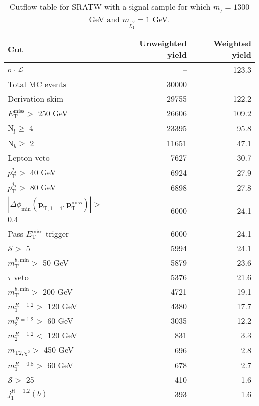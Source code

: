 
\begin{table}[htb]
  \caption{Cutflow table for SRATW with a signal sample for which $m_{\tilde{t}}=1300$ GeV and $m_{\tilde{\chi}^0_1}=1$ GeV.}
  \begin{center}
    \def\arraystretch{1.4}
    \begin{tabular}{l||r|r} \hline\hline
      \textbf{Cut} & Unweighted yield & Weighted yield \\ \hline \hline
      $\sigma\cdot\mathcal{L}$ & -- & 123.3 \\ \hline
      Total MC events & 30000 & -- \\ \hline
      Derivation skim & 29755 & 122.2 \\ \hline 
      $E_{\mathrm{T}}^{\mathrm{miss}} >$ 250 GeV & 26606 & 109.2 \\ \hline 
      $\mathrm{N}_{\mathrm{j}} \ge$ 4 & 23395 & 95.8 \\ \hline 
      $\mathrm{N}_{b} \ge$ 2 & 11651 & 47.1 \\ \hline 
      Lepton veto & 7627 & 30.7 \\ \hline 
      $p_{\mathrm{T}}^{j_4} >$ 40 GeV & 6924 & 27.9 \\ \hline 
      $p_{\mathrm{T}}^{j_2} >$ 80 GeV & 6898 & 27.8 \\ \hline 
      $\left|\Delta\phi_{\min}\left(\mathbf{p}_{\mathrm{T},1-4},\mathbf{p}_\mathrm{T}^\mathrm{miss}\right)\right| >$ 0.4 & 6000 & 24.1 \\ \hline 
      Pass $E_{\mathrm{T}}^{\mathrm{miss}}$ trigger & 6000 & 24.1 \\ \hline 
      $\mathcal{S} >$ 5 & 5994 & 24.1 \\ \hline 
      $m_{\mathrm{T}}^{b,\mathrm{min}} >$ 50 GeV & 5879 & 23.6 \\ \hline 
      $\tau$ veto & 5376 & 21.6 \\ \hline 
      $m_{\mathrm{T}}^{b,\mathrm{min}} >$ 200 GeV & 4721 & 19.1 \\ \hline 
      $m_{1}^{R=1.2} >$ 120 GeV & 4380 & 17.7 \\ \hline 
      $m_{2}^{R=1.2} >$ 60 GeV & 3035 & 12.2 \\ \hline 
      $m_{2}^{R=1.2} <$ 120 GeV & 831 & 3.3 \\ \hline 
      $m_{\mathrm{T2,\chi^2}} >$ 450 GeV & 696 & 2.8 \\ \hline 
      $m_{1}^{R=0.8} >$ 60 GeV & 678 & 2.7 \\ \hline 
      $\mathcal{S} >$ 25 & 410 & 1.6 \\ \hline 
      $j^{R=1.2}_1(b)$ & 393 & 1.6 \\ \hline 
      
      \hline 
    \end{tabular}
  \end{center}
  \label{tab:cutFlow_SRATW}
\end{table}
